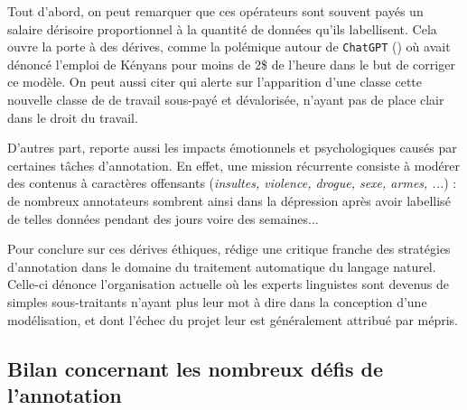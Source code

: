 			Tout d'abord, on peut remarquer que ces opérateurs sont souvent payés un salaire dérisoire proportionnel à la quantité de données qu'ils labellisent.
			Cela ouvre la porte à des dérives, comme la polémique autour de \texttt{ChatGPT} (\cite{openai:2023:chatgpt}) où \cite{perrigo-zorthian:2023:exclusive-openai-used} avait dénoncé l'emploi de Kényans pour moins de $2$\$ de l'heure dans le but de corriger ce modèle.
			On peut aussi citer \cite{dzieza:2023:ai-lot-work} qui alerte sur l'apparition d'une classe cette nouvelle classe de de travail sous-payé et dévalorisée, n'ayant pas de place clair dans le droit du travail.
			
			D'autres part, \cite{rowe:2023:it-destroyed-me} reporte aussi les impacts émotionnels et psychologiques causés par certaines tâches d'annotation.
			En effet, une mission récurrente consiste à modérer des contenus à caractères offensants (\textit{insultes, violence, drogue, sexe, armes, ...}) : de nombreux annotateurs sombrent ainsi dans la dépression après avoir labellisé de telles données pendant des jours voire des semaines...
			
			\begin{leftBarInformation}
				Pour conclure sur ces dérives éthiques, \cite{valette:2016:analyse-statistique-donnees} rédige une critique franche des stratégies d'annotation dans le domaine du traitement automatique du langage naturel.
				Celle-ci dénonce l'organisation actuelle où les experts linguistes sont devenus de simples sous-traitants n'ayant plus leur mot à dire dans la conception d'une modélisation, et dont l'échec du projet leur est généralement attribué par mépris.
			\end{leftBarInformation}
	
	
	\subsection{Bilan concernant les nombreux défis de l'annotation}
	\label{section:2.3.4-DEFIS-ANNOTATION-BILAN}
	
